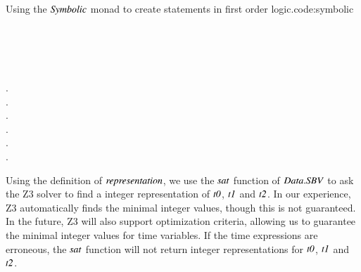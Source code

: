 \begin{texexptitled}{Using the \ensuremath{\Conid{Symbolic}} monad to create statements in first order logic.}{code:symbolic}
\begin{hscode}\SaveRestoreHook
{}%
%
%
%
%
\>[B]{}\mathrel{=}{}\<[E]%
\\
\>[B]{}\<[3]%
\>[3]{}\;{}\<[7]%
\>[7]{}\leftarrow{}\;\<[E]%
\\
\>[7]{}\leftarrow{}\;\<[E]%
\\
\>[7]{}\leftarrow{}\;\<[E]%
\\
\>[7]{}\mathbin{\$}\<[27]%
\>[27]{}.\geq{}\<[E]%
\\
\>[7]{}\mathbin{\$}\<[27]%
\>[27]{}.\geq{}\<[E]%
\\
\>[7]{}\mathbin{\$}\<[27]%
\>[27]{}.\geq{}\<[E]%
\\
\>[7]{}\mathbin{\$}\mathbin{+}\<[27]%
\>[27]{}.\geq{}\mathbin{+}\<[E]%
\\
\>[7]{}\mathbin{\$}\<[27]%
\>[27]{}.\geq{}\<[E]%
\\
\>[7]{}\mathbin{\$}\<[27]%
\>[27]{}.\geq{}\<[E]%
\\
\>[7]{}\<[E]%
\ColumnHook
\end{hscode}\resethooks
\end{texexptitled}

Using the definition of \ensuremath{\Varid{representation}}, we use the \ensuremath{\Varid{sat}} function of \ensuremath{\Conid{\Conid{Data}.SBV}} to ask the Z3 solver to find a integer representation of \ensuremath{\Varid{t0}}, \ensuremath{\Varid{t1}} and \ensuremath{\Varid{t2}}.
In our experience, Z3 automatically finds the minimal integer values, though this is not guaranteed.
In the future, Z3 will also support optimization criteria, allowing us to guarantee the minimal integer values for time variables.
If the time expressions are erroneous, the \ensuremath{\Varid{sat}} function will not return integer representations for \ensuremath{\Varid{t0}}, \ensuremath{\Varid{t1}} and \ensuremath{\Varid{t2}}.

